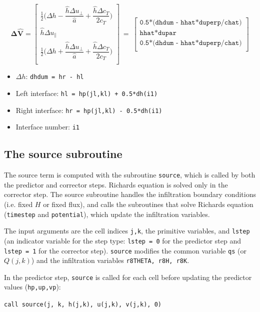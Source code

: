 \documentclass{article}
\newcommand{\code}[1]{\texttt{#1}}
\begin{document}
 \[ \mathbf{\Delta \hat{V}} = 
\begin{bmatrix}
	\frac{1}{2} \bigg( \Delta h - \dfrac{\hat h \Delta u_{\perp} }{\hat a} +
	 \dfrac{\hat h \Delta c_T }{2  c_T}\bigg) \\[.2cm]
      \hat h \Delta u_\parallel   \\[.2cm]
   	\frac{1}{2} \bigg( \Delta h + \dfrac{\hat h \Delta u_{\perp} }{\hat a} +
	 \dfrac{\hat h \Delta c_T }{2  c_T}\bigg) 
	 \\
\end{bmatrix} \ =  \ 
\begin{bmatrix}
 \code{0.5*(dhdum - hhat*duperp/chat)}  \\[.2cm]
 \code{hhat*dupar}  \\[.2cm]
 \code{0.5*(dhdum - hhat*duperp/chat)}  \\
\end{bmatrix} 
\]

  \begin{itemize}
 	\item  $\Delta h$: \code{dhdum = hr - hl } 
 	\item  Left interface:   \code{hl = hp(jl,kl) + 0.5*dh(i1)}
  	\item  Right interface:   \code{hr = hp(jl,kl) - 0.5*dh(i1)}
	 \item Interface number: \code{i1} 
 \end{itemize}
 

\subsection{The source subroutine}

 The source term is computed with the subroutine \code{source}, which is called by both the predictor and corrector steps.
Richards equation is solved only in the corrector step.     The  source subroutine handles the infiltration boundary conditions (i.e. fixed $H$ or fixed flux), and calls the subroutines that solve Richards equation (\code{timestep} and \code{potential}), which update the infiltration variables.  
 
 The input arguments are the cell indices \code{j,k}, the primitive variables, and \code{lstep} (an indicator variable for the step type: \code{lstep = 0} for the predictor step and \code{lstep = 1}  for the corrector step).	\code{source} modifies the common variable \code{qs} (or $Q(j,k)$) and the infiltration variables \code{r8THETA, r8H, r8K}. 
 
In the predictor step, \code{source} is called for each cell before updating the predictor values (\code{hp,up,vp}):
\begin{center}
\code{call source(j, k, h(j,k), u(j,k), v(j,k), 0)}
\end{center}
\end{document}
